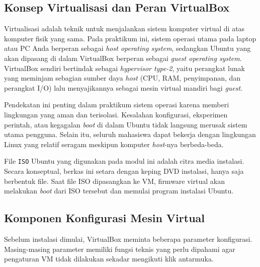 \subsection{Konsep Virtualisasi dan Peran VirtualBox}
Virtualisasi adalah teknik untuk menjalankan sistem komputer virtual di atas komputer fisik yang sama. Pada praktikum ini, sistem operasi utama pada laptop atau PC Anda berperan sebagai \textit{host operating system}, sedangkan Ubuntu yang akan dipasang di dalam VirtualBox berperan sebagai \textit{guest operating system}. VirtualBox sendiri bertindak sebagai \textit{hypervisor type-2}, yaitu perangkat lunak yang meminjam sebagian sumber daya \textit{host} (CPU, RAM, penyimpanan, dan perangkat I/O) lalu menyajikannya sebagai mesin virtual mandiri bagi \textit{guest}.

Pendekatan ini penting dalam praktikum sistem operasi karena memberi lingkungan yang aman dan terisolasi. Kesalahan konfigurasi, eksperimen perintah, atau kegagalan \textit{boot} di dalam Ubuntu tidak langsung merusak sistem utama pengguna. Selain itu, seluruh mahasiswa dapat bekerja dengan lingkungan Linux yang relatif seragam meskipun komputer \textit{host}-nya berbeda-beda.

File \texttt{ISO} Ubuntu yang digunakan pada modul ini adalah citra media instalasi. Secara konseptual, berkas ini setara dengan keping DVD instalasi, hanya saja berbentuk file. Saat file ISO dipasangkan ke VM, firmware virtual akan melakukan \textit{boot} dari ISO tersebut dan memulai program instalasi Ubuntu.

\subsection{Komponen Konfigurasi Mesin Virtual}
Sebelum instalasi dimulai, VirtualBox meminta beberapa parameter konfigurasi. Masing-masing parameter memiliki fungsi teknis yang perlu dipahami agar pengaturan VM tidak dilakukan sekadar mengikuti klik antarmuka.

